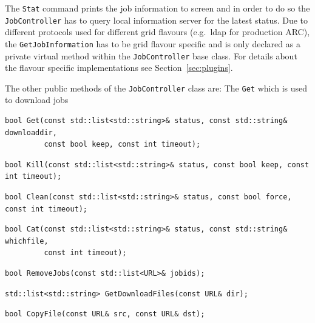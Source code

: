 \documentclass{book}
\newcommand{\JobController}{\texttt{JobController}}
\begin{document}
The \texttt{Stat} command prints the job information to screen and in
order to do so the {\JobController} has to query local information
server for the latest status. Due to different protocols used for
different grid flavours (e.g.\ ldap for production ARC), the
\texttt{GetJobInformation} has to be grid flavour specific and is only
declared as a private virtual method within the {\JobController} base
class. For details about the flavour specific implementations see
Section~\ref{sec:plugins}.

The other public methods of the {\JobController} class are:
The \texttt{Get} which is used to download jobs
\begin{shaded}
\begin{verbatim}
bool Get(const std::list<std::string>& status, const std::string& downloaddir,
         const bool keep, const int timeout);
\end{verbatim}
\end{shaded}
\begin{shaded}
\begin{verbatim}
bool Kill(const std::list<std::string>& status, const bool keep, const int timeout);
\end{verbatim}
\end{shaded}
\begin{shaded}
\begin{verbatim}
bool Clean(const std::list<std::string>& status, const bool force, const int timeout);
\end{verbatim}
\end{shaded}
\begin{shaded}
\begin{verbatim}
bool Cat(const std::list<std::string>& status, const std::string& whichfile, 
         const int timeout);
\end{verbatim}
\end{shaded}
\begin{shaded}
\begin{verbatim}
bool RemoveJobs(const std::list<URL>& jobids);
\end{verbatim}
\end{shaded}
\begin{shaded}
\begin{verbatim}
std::list<std::string> GetDownloadFiles(const URL& dir);
\end{verbatim}
\end{shaded}
\begin{shaded}
\begin{verbatim}
bool CopyFile(const URL& src, const URL& dst);
\end{verbatim}
\end{shaded}
\end{document}
